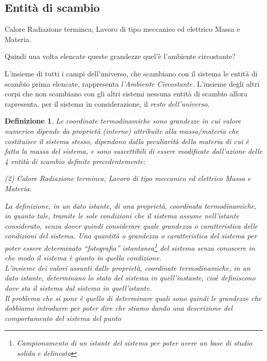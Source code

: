 \documentclass{book}
\newtheorem{defi}{Definizione}
\begin{document}
\subsection{Entità di scambio}
\begin{tasks}
    \task Calore
    \task Radiazione terminca;
    \task Lavoro di tipo meccanico ed elettrico
    \task Massa e Materia.
\end{tasks}
\begin{center}
  Quindi una volta elencate queste grandezze quel'è l'ambiente circostante?
\end{center}
L'insieme di tutti i campi dell'universo, che scambiano con il sistema le entità
di scambio prima elencate, rappresenta {\it l'Ambiente Circostante.} L'insieme degli
altri corpi che non scambiano con gli altri sistemi nessuna entità di scambio allora
rapresenta, per il sistema in considerazione, il {\it resto dell'universo}.
\begin{defi}
  Le coordinate termodinamiche sono grandezze in cui valore numerico dipende da proprietà ({\it interne})
  attribuite alla massa/materia che costituisce il sistema stesso, dipendono dalla peculiarità della materia
  di cui è fatta la massa del sistema, e sono suscettibili di essere modificate dall'azione delle 4 entità
  di scambio definite precedentemente:
  \begin{tasks}(2)
    \task Calore
    \task Radiazione terminca;
    \task Lavoro di tipo meccanico ed elettrico
    \task Massa e Materia.
  \end{tasks}
  La definizione, in un dato istante, di una proprietà, coordinata termodinamiche, in quanto tale, tramite le
  sole condizioni che il sistema assume nell'istante considerato, senza dover quindi considerare quale grandezza
  o caratteristica delle condizioni del sistema. Una quantità o grandezza o caratteristica del sistema per
  poter essere determinato ``fotografia'' istantanea\footnote{Campionamento di un istante del sistema
    per poter avere un base di studio solida e delineata} del sistema senza conoscere in che modo il sistema
  è giunto in quella condizione.\\
  L'insieme dei valori assunti dalle proprietà, coordinate termodinamiche, in un dato istante, determinano lo
  stato del sistema in quell'instante, cioè definiscono dove sta il sistema dal sistema in quell'istante.\\
  Il problema che si pone è quello di determinare quali sono quindi le grandezze che dobbiamo introdurre per
  poter dire che stiamo dando una descrizione del comportamento del sistema del punto 
\end{defi}
\end{document}
